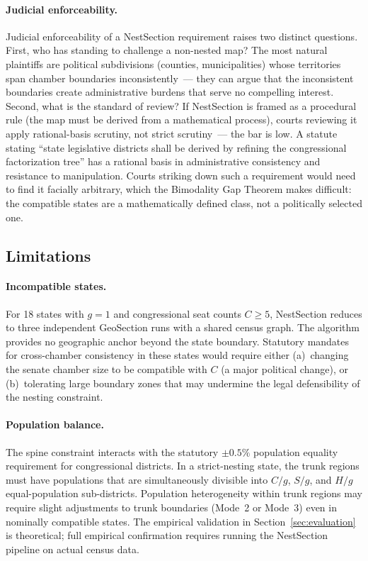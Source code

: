 \paragraph{Judicial enforceability.}
Judicial enforceability of a NestSection requirement raises two distinct
questions.  First, who has standing to challenge a non-nested map?  The most
natural plaintiffs are political subdivisions (counties, municipalities) whose
territories span chamber boundaries inconsistently~--- they can argue that the
inconsistent boundaries create administrative burdens that serve no compelling
interest.  Second, what is the standard of review?  If NestSection is framed
as a procedural rule (the map must be derived from a mathematical process),
courts reviewing it apply rational-basis scrutiny, not strict scrutiny~--- the
bar is low.  A statute stating ``state legislative districts shall be derived
by refining the congressional factorization tree'' has a rational basis in
administrative consistency and resistance to manipulation.  Courts striking
down such a requirement would need to find it facially arbitrary, which the
Bimodality Gap Theorem makes difficult: the compatible states are a
mathematically defined class, not a politically selected one.

\subsection{Limitations}

\paragraph{Incompatible states.}
For 18 states with $g = 1$ and congressional seat counts $C \geq 5$, NestSection
reduces to three independent GeoSection runs with a shared census graph.  The
algorithm provides no geographic anchor beyond the state boundary.  Statutory
mandates for cross-chamber consistency in these states would require either
(a)~changing the senate chamber size to be compatible with $C$ (a major
political change), or (b)~tolerating large boundary zones that may undermine
the legal defensibility of the nesting constraint.

\paragraph{Population balance.}
The spine constraint interacts with the statutory $\pm 0.5\%$ population
equality requirement for congressional districts.  In a strict-nesting state,
the trunk regions must have populations that are simultaneously divisible
into $C/g$, $S/g$, and $H/g$ equal-population sub-districts.  Population
heterogeneity within trunk regions may require slight adjustments to trunk
boundaries (Mode~2 or Mode~3) even in nominally compatible states.
The empirical validation in Section~\ref{sec:evaluation} is theoretical;
full empirical confirmation requires running the NestSection pipeline on
actual census data.

